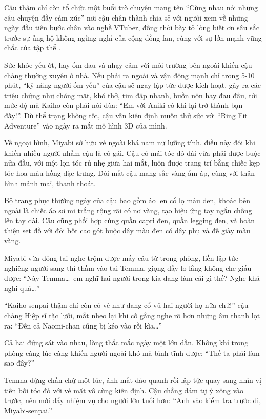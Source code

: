 \documentclass[../main.tex]{subfiles}
\begin{document}
Cậu thậm chí còn tổ chức một buổi trò chuyện mang tên ``Cùng nhau nói những câu chuyện đầy cảm xúc'' nơi cậu chân thành chia sẻ với người xem về những ngày đầu tiên bước chân vào nghề VTuber, đồng thời bày tỏ lòng biết ơn sâu sắc trước sự ủng hộ không ngừng nghỉ của cộng đồng fan, cùng với sự lớn mạnh vững chắc của tập thể \hls.

Sức khỏe yếu ớt, hay ốm đau và nhạy cảm với môi trường bên ngoài khiến cậu chàng thường xuyên ở nhà. Nếu phải ra ngoài và vận động mạnh chỉ trong 5-10 phút, ``kỹ năng người ốm yếu'' của cậu sẽ ngay lập tức được kích hoạt, gây ra các triệu chứng như chóng mặt, khó thở, tim đập nhanh, buồn nôn hay đau đầu, tới mức độ mà Kaiho còn phải nói đùa: ``Em với Aniki có khi lại trở thành bạn đấy!''. Dù thể trạng không tốt, cậu vẫn kiên định muốn thử sức với ``Ring Fit Adventure'' vào ngày ra mắt mô hình 3D của mình.

Về ngoại hình, Miyabi sở hữu vẻ ngoài khá nam nữ lưỡng tính, điều này đôi khi khiến nhiều người nhầm cậu là cô gái. Cậu có mái tóc đỏ dài vừa phải được buộc nửa đầu, với một lọn tóc rủ nhẹ giữa hai mắt, luôn được trang trí bằng chiếc kẹp tóc hoa màu hồng đặc trưng. Đôi mắt cậu mang sắc vàng ấm áp, cùng với thân hình mảnh mai, thanh thoát.

Bộ trang phục thường ngày của cậu bao gồm áo len cổ lọ màu đen, khoác bên ngoài là chiếc áo sơ mi trắng rộng rãi có nơ vàng, tạo hiệu ứng tay ngắn chồng lên tay dài. Cậu cũng phối hợp cùng quần capri đen, quần legging đen, và hoàn thiện set đồ với đôi bốt cao gót buộc dây màu đen có dây phụ và đế giày màu vàng.

\chrint

Miyabi vừa dỏng tai nghe trộm được mấy câu từ trong phòng, liền lập tức nghiêng người sang thì thầm vào tai Temma, giọng đầy lo lắng không che giấu được: ``Này Temma\dots\ em nghĩ hai người trong kia đang làm cái gì thế? Nghe khả nghi quá\dots''

``Kaiho-senpai thậm chí còn có vẻ như đang cổ vũ hai người họ nữa chứ!'' cậu chàng Hiệp sĩ tặc lưỡi, mắt nheo lại khi cố gắng nghe rõ hơn những âm thanh lọt ra: ``Đến cả Naomi-chan cũng bị kéo vào rồi kìa\dots''

Cả hai đứng sát vào nhau, lòng thắc mắc ngày một lớn dần. Không khí trong phòng càng lúc càng khiến người ngoài khó mà bình tĩnh được: ``Thế ta phải làm sao đây?''


Temma đứng chần chừ một lúc, ánh mắt đảo quanh rồi lập tức quay sang nhìn vị tiền bối tóc đỏ với vẻ mặt vô cùng kiên định. Cậu chẳng dám tự ý xông vào trước, nên mới đẩy nhiệm vụ cho người lớn tuổi hơn: ``Anh vào kiểm tra trước đi, Miyabi-senpai.''
\end{document}
